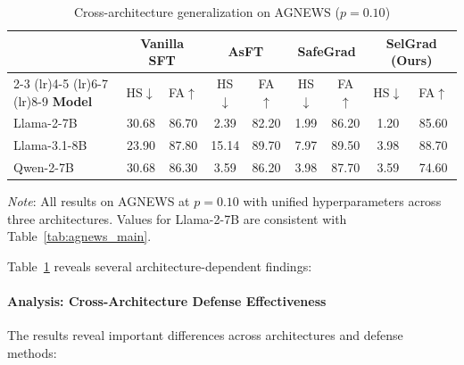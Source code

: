\begin{table}[htbp]
\centering
\caption{Cross-architecture generalization on AGNEWS ($p=0.10$)}
\label{tab:cross_architecture}
\renewcommand{\arraystretch}{1.2}
\begin{tabular}{l cc cc cc cc}
\toprule
& \multicolumn{2}{c}{\textbf{Vanilla SFT}} & \multicolumn{2}{c}{\textbf{AsFT}} & \multicolumn{2}{c}{\textbf{SafeGrad}} & \multicolumn{2}{c}{\textbf{SelGrad (Ours)}} \\
\cmidrule(lr){2-3} \cmidrule(lr){4-5} \cmidrule(lr){6-7} \cmidrule(lr){8-9}
\textbf{Model} & HS$\downarrow$ & FA$\uparrow$ & HS$\downarrow$ & FA$\uparrow$ & HS$\downarrow$ & FA$\uparrow$ & HS$\downarrow$ & FA$\uparrow$ \\
\midrule
Llama-2-7B & 30.68 & \cellcolor{bestcolor}86.70 & 2.39 & 82.20 & 1.99 & 86.20 & \cellcolor{bestcolor}1.20 & 85.60 \\
Llama-3.1-8B & 23.90 & 87.80 & 15.14 & \cellcolor{bestcolor}89.70 & 7.97 & 89.50 & \cellcolor{bestcolor}3.98 & 88.70 \\
Qwen-2-7B & 30.68 & 86.30 & \cellcolor{bestcolor}3.59 & 86.20 & 3.98 & \cellcolor{bestcolor}87.70 & \cellcolor{bestcolor}3.59 & 74.60 \\
\bottomrule
\end{tabular}

\vspace{0.3em}
\noindent\textit{Note}: All results on AGNEWS at $p=0.10$ with unified hyperparameters across three architectures. Values for Llama-2-7B are consistent with Table~\ref{tab:agnews_main}.
\end{table}

Table~\ref{tab:cross_architecture} reveals several architecture-dependent findings:

\paragraph{Analysis: Cross-Architecture Defense Effectiveness}
The results reveal important differences across architectures and defense methods:

